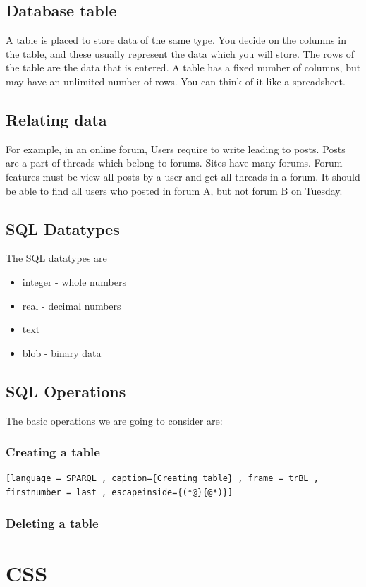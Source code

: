 \documentclass[a4paper]{article}
\theoremstyle{plain}
\theoremstyle{definition}
\theoremstyle{remark}
\begin{document}
\begin{flushleft}
\subsection{Database table}
A table is placed to store data of the same type. You decide on the columns in the table, and these usually represent the data which you will store. The rows of the table are the data that is entered. A table has a fixed number of columns, but may have an unlimited number of rows. You can think of it like a spreadsheet. 
\subsection{Relating data}
For example, in an online forum, Users require to write leading to posts. Posts are a part of threads which belong to forums. Sites have many forums. Forum features must be view all posts by a user and get all threads in a forum. It should be able to find all users who posted in forum A, but not forum B on Tuesday.
\subsection{SQL Datatypes}
The SQL datatypes are
\begin{itemize}
	\item integer - whole numbers
	\item real - decimal numbers
	\item text
	\item blob - binary data
\end{itemize}
\subsection{SQL Operations}
The basic operations we are going to consider are:
\subsubsection{Creating a table}
\begin{lstlisting}[language = SPARQL , caption={Creating table} , frame = trBL , firstnumber = last , escapeinside={(*@}{@*)}]

\end{lstlisting}
\subsubsection{Deleting a table}

\section{CSS}

\end{flushleft}
\end{document}
